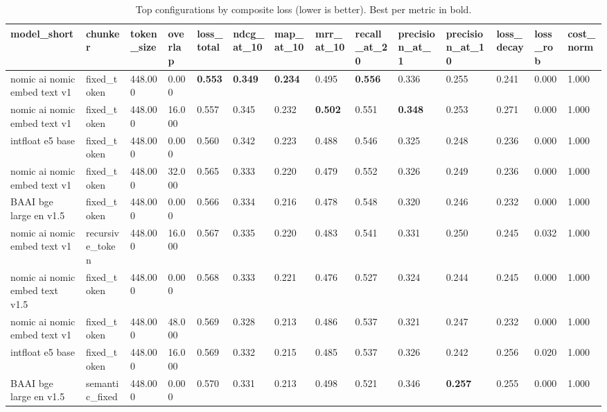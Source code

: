 \begin{table}[t]
\centering
\small
\begin{tabular}{l l l l l l l l l l l l l l}
\toprule
model_short & chunker & token_size & overlap & loss_total & ndcg_at_10 & map_at_10 & mrr_at_10 & recall_at_20 & precision_at_1 & precision_at_10 & loss_decay & loss_rob & cost_norm \\
\midrule
nomic ai nomic embed text v1 & fixed_token & 448.000 & 0.000 & \textbf{0.553} & \textbf{0.349} & \textbf{0.234} & 0.495 & \textbf{0.556} & 0.336 & 0.255 & 0.241 & 0.000 & 1.000 \\
nomic ai nomic embed text v1 & fixed_token & 448.000 & 16.000 & 0.557 & 0.345 & 0.232 & \textbf{0.502} & 0.551 & \textbf{0.348} & 0.253 & 0.271 & 0.000 & 1.000 \\
intfloat e5 base & fixed_token & 448.000 & 0.000 & 0.560 & 0.342 & 0.223 & 0.488 & 0.546 & 0.325 & 0.248 & 0.236 & 0.000 & 1.000 \\
nomic ai nomic embed text v1 & fixed_token & 448.000 & 32.000 & 0.565 & 0.333 & 0.220 & 0.479 & 0.552 & 0.326 & 0.249 & 0.236 & 0.000 & 1.000 \\
BAAI bge large en v1.5 & fixed_token & 448.000 & 0.000 & 0.566 & 0.334 & 0.216 & 0.478 & 0.548 & 0.320 & 0.246 & 0.232 & 0.000 & 1.000 \\
nomic ai nomic embed text v1 & recursive_token & 448.000 & 16.000 & 0.567 & 0.335 & 0.220 & 0.483 & 0.541 & 0.331 & 0.250 & 0.245 & 0.032 & 1.000 \\
nomic ai nomic embed text v1.5 & fixed_token & 448.000 & 0.000 & 0.568 & 0.333 & 0.221 & 0.476 & 0.527 & 0.324 & 0.244 & 0.245 & 0.000 & 1.000 \\
nomic ai nomic embed text v1 & fixed_token & 448.000 & 48.000 & 0.569 & 0.328 & 0.213 & 0.486 & 0.537 & 0.321 & 0.247 & 0.232 & 0.000 & 1.000 \\
intfloat e5 base & fixed_token & 448.000 & 16.000 & 0.569 & 0.332 & 0.215 & 0.485 & 0.537 & 0.326 & 0.242 & 0.256 & 0.020 & 1.000 \\
BAAI bge large en v1.5 & semantic_fixed & 448.000 & 0.000 & 0.570 & 0.331 & 0.213 & 0.498 & 0.521 & 0.346 & \textbf{0.257} & 0.255 & 0.000 & 1.000 \\
\bottomrule
\end{tabular}
\caption{Top configurations by composite loss (lower is better). Best per metric in bold.}
\label{tab:leaderboard}
\end{table}